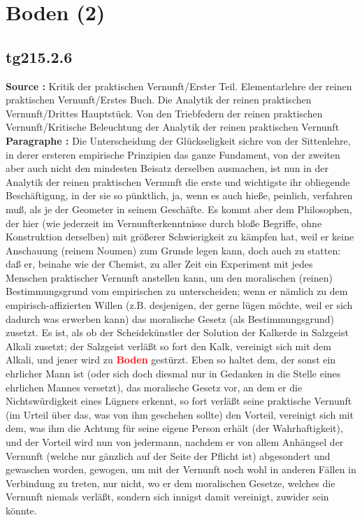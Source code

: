 \documentclass[a4paper,12pt,twoside]{book}
\newcommand{\match}[1]{\textcolor{red}{\textbf{#1}}}
\newcommand{\unnumberedsection}[1]{
	\section*{#1}
	\addcontentsline{toc}{section}{#1}
	\markright{#1}
}
\begin{document}
	\unnumberedsection{Boden (2)} 
	\subsection*{tg215.2.6} 
	\textbf{Source : }Kritik der praktischen Vernunft/Erster Teil. Elementarlehre der reinen praktischen Vernunft/Erstes Buch. Die Analytik der reinen praktischen Vernunft/Drittes Hauptstück. Von den Triebfedern der reinen praktischen Vernunft/Kritische Beleuchtung der Analytik der reinen praktischen Vernunft\\  
	
	\textbf{Paragraphe : }Die Unterscheidung der Glückseligkeit sichre von der Sittenlehre, in derer ersteren empirische Prinzipien das ganze Fundament, von der zweiten aber auch nicht den mindesten Beisatz derselben ausmachen, ist nun in der Analytik der reinen praktischen Vernunft die erste und wichtigste ihr obliegende Beschäftigung, in der sie so pünktlich, ja, wenn es auch hieße, peinlich, verfahren muß, als je der Geometer in seinem Geschäfte. Es kommt aber dem Philosophen, der hier (wie jederzeit im Vernunfterkenntnisse durch bloße Begriffe, ohne Konstruktion derselben) mit größerer Schwierigkeit zu kämpfen hat, weil er keine Anschauung  (reinem Noumen) zum Grunde legen kann, doch auch zu statten: daß er, beinahe wie der Chemist, zu aller Zeit ein Experiment mit jedes Menschen praktischer Vernunft anstellen kann, um den moralischen (reinen) Bestimmungsgrund vom empirischen zu unterscheiden; wenn er nämlich zu dem empirisch-affizierten Willen (z.B. desjenigen, der gerne lügen möchte, weil er sich dadurch was erwerben kann) das moralische Gesetz (als Bestimmungsgrund) zusetzt. Es ist, als ob der Scheidekünstler der Solution der Kalkerde in Salzgeist Alkali zusetzt; der Salzgeist verläßt so fort den Kalk, vereinigt sich mit dem Alkali, und jener wird zu \match{Boden} gestürzt. Eben so haltet dem, der sonst ein ehrlicher Mann ist (oder sich doch diesmal nur in Gedanken in die Stelle eines ehrlichen Mannes versetzt), das moralische Gesetz vor, an dem er die Nichtswürdigkeit eines Lügners erkennt, so fort verläßt seine praktische Vernunft (im Urteil über das, was von ihm geschehen sollte) den Vorteil, vereinigt sich mit dem, was ihm die Achtung für seine eigene Person erhält (der Wahrhaftigkeit), und der Vorteil wird nun von jedermann, nachdem er von allem Anhängsel der Vernunft (welche nur gänzlich auf der Seite der Pflicht ist) abgesondert und gewaschen worden, gewogen, um mit der Vernunft noch wohl in anderen Fällen in Verbindung zu treten, nur nicht, wo er dem moralischen Gesetze, welches die Vernunft niemals verläßt, sondern sich innigst damit vereinigt, zuwider sein könnte. 
	
\end{document}
